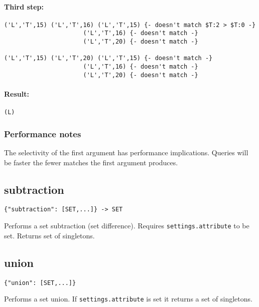 \documentclass[a4paper]{article}
\begin{document}
\paragraph*{Third step:}

\begin{verbatim}
('L','T',15) ('L','T',16) ('L','T',15) {- doesn't match $T:2 > $T:0 -}
                      ('L','T',16) {- doesn't match -}
                      ('L','T',20) {- doesn't match -}

('L','T',15) ('L','T',20) ('L','T',15) {- doesn't match -}
                      ('L','T',16) {- doesn't match -}
                      ('L','T',20) {- doesn't match -}                      
\end{verbatim}


\paragraph*{Result: }

\begin{verbatim}
(L)
\end{verbatim}

\subsubsection{Performance notes}

The selectivity of the first argument has performance
implications. Queries will be faster the fewer matches the first
argument produces.

\subsection{subtraction}

\begin{verbatim}
{"subtraction": [SET,...]} -> SET
\end{verbatim}

Performs a set subtraction (set difference). Requires
\verb|settings.attribute| to be set. Returns set of singletons.

\subsection{union}

\begin{verbatim}
{"union": [SET,...]}
\end{verbatim}

Performs a set union. If \verb|settings.attribute| is set it returns a
set of singletons.
\end{document}
